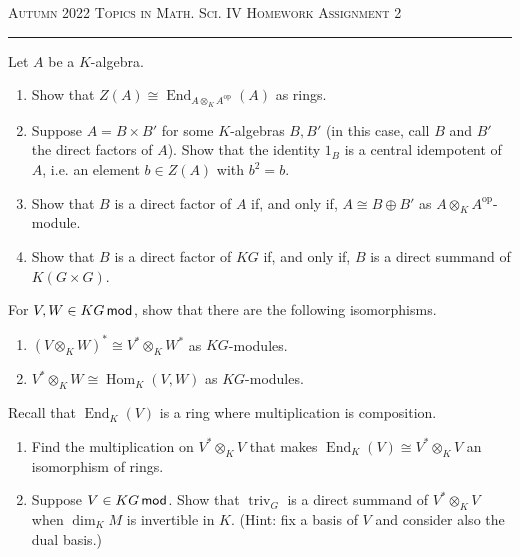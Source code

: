 \documentclass[12pt]{article}
\newcommand{\Hom}{\operatorname{Hom}\nolimits}
\newcommand{\End}{\operatorname{End}\nolimits}
\newcommand{\triv}{\operatorname{triv}\nolimits}
\begin{document}
{\scshape Autumn 2022} \hfill {\scshape \large Topics in Math. Sci. IV} \hfill {\scshape Homework Assignment 2}
\smallskip

\hrule

\bigskip


\begin{question}
Let $A$ be a $K$-algebra.
\begin{enumerate}
\item Show that $Z(A)\cong \End_{A\otimes_K A^{\mathrm{op}}}(A)$ as rings.

\item Suppose $A=B\times B'$ for some $K$-algebras $B,B'$ (in this case, call $B$ and $B'$ the direct factors of $A$).  Show that the identity $1_B$ is a central idempotent of $A$, i.e. an element $b\in Z(A)$ with $b^2=b$.

\item Show that $B$ is a direct factor of $A$ if, and only if, $A\cong B\oplus B'$ as $A\otimes_K A^{\mathrm{op}}$-module.

\item Show that $B$ is a direct factor of $KG$ if, and only if, $B$ is a direct summand of $K(G\times G)$.
\end{enumerate}
\end{question}

\begin{question}
For $V,W\in KG\mod$, show that there are the following isomorphisms.
\begin{enumerate}
\item $(V\otimes_KW)^*\cong V^*\otimes_K W^*$ as $KG$-modules.
\item $V^* \otimes_K W \cong \Hom_K(V,W)$ as $KG$-modules.
\end{enumerate}
\end{question}


\begin{question}
Recall that $\End_K(V)$ is a ring where multiplication is composition.
\begin{enumerate}
\item Find the multiplication on $V^*\otimes_K V$ that makes $\End_K(V)\cong V^*\otimes_K V$ an isomorphism of rings.

\item Suppose $V\in KG\mod$.  Show that $\triv_G$ is a direct summand of $V^*\otimes_K V$ when $\dim_K M$ is invertible in $K$.  (Hint: fix a basis of $V$ and consider also the dual basis.)
\end{enumerate}
\end{question}
\end{document}
